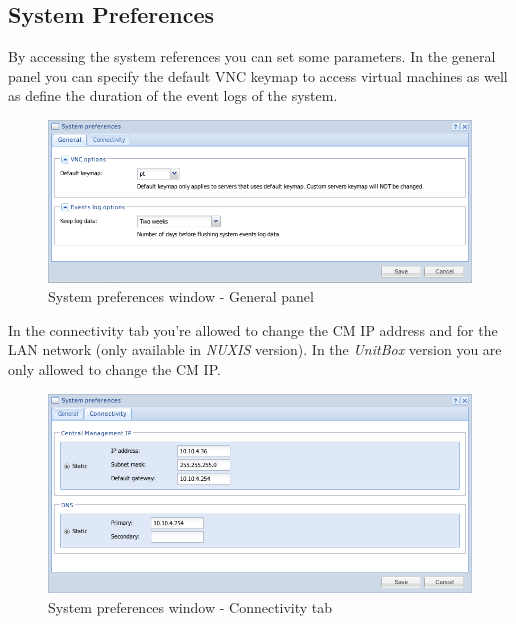 \subsection{System Preferences}
By accessing the system references you can set some parameters. 
In the general panel you can specify the default VNC keymap to access virtual machines as well as define the duration of the event logs of the system.
 
\begin{figure}[H]
        \begin{center}
        \includegraphics[scale=0.5]{screenshots/preferences_general.png}
        \caption{System preferences window - General panel}
        \label{fig:preferences_general}
        \end{center}
\end{figure}

In the connectivity tab you're allowed to change the CM IP address and for the LAN network (only available in \emph{NUXIS} version). In the \emph{UnitBox} version you are only allowed to change the CM IP.

\begin{figure}[H]
        \begin{center}
        \includegraphics[scale=0.5]{screenshots/preferences_conn.png}
        \caption{System preferences window - Connectivity tab}
        \label{fig:preferences_conn}
        \end{center}
\end{figure}


